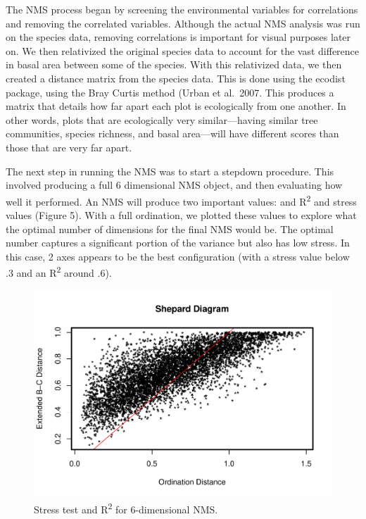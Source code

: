 \documentclass[
  12pt,
]{article}
\begin{document}
The NMS process began by screening the environmental variables for
correlations and removing the correlated variables. Although the actual
NMS analysis was run on the species data, removing correlations is
important for visual purposes later on. We then relativized the original
species data to account for the vast difference in basal area between
some of the species. With this relativized data, we then created a
distance matrix from the species data. This is done using the ecodist
package, using the Bray Curtis method (Urban et al.~2007. This produces
a matrix that details how far apart each plot is ecologically from one
another. In other words, plots that are ecologically very
similar---having similar tree communities, species richness, and basal
area---will have different scores than those that are very far apart.

The next step in running the NMS was to start a stepdown procedure. This
involved producing a full 6 dimensional NMS object, and then evaluating
how well it performed. An NMS will produce two important values: and
R\textsuperscript{2} and stress values (Figure 5). With a full
ordination, we plotted these values to explore what the optimal number
of dimensions for the final NMS would be. The optimal number captures a
significant portion of the variance but also has low stress. In this
case, 2 axes appears to be the best configuration (with a stress value
below .3 and an R\textsuperscript{2} around .6).

\begin{figure}
\centering
\includegraphics{ProjectDraft_files/figure-latex/unnamed-chunk-10-1.pdf}
\caption{Stress test and R\textsuperscript{2} for 6-dimensional NMS.}
\end{figure}
\end{document}
